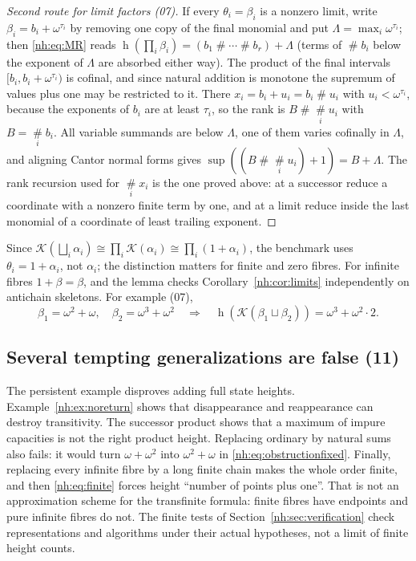 \documentclass[11pt,a4paper]{article}
\theoremstyle{definition}
\theoremstyle{remark}
\newcommand{\K}{\mathcal K}
\newcommand{\hgt}{\operatorname{h}}
\newcommand{\ns}{\mathbin{\#}}
\newcommand{\bigns}{\mathop{\#}\limits}
\begin{document}
\begin{proof}[Second route for limit factors (07)]
If every $\theta_i=\beta_i$ is a nonzero limit, write $\beta_i=b_i+\omega^{\tau_i}$
by removing one copy of the final monomial and put
$\Lambda=\max_i\omega^{\tau_i}$; then \eqref{nh:eq:MR} reads
$\hgt(\prod_i\beta_i)=(b_1\ns\cdots\ns b_r)+\Lambda$ (terms of $\bigns b_i$
below the exponent of $\Lambda$ are absorbed either way). The product of the
final intervals $[b_i,b_i+\omega^{\tau_i})$ is cofinal, and since natural
addition is monotone the supremum of values plus one may be restricted to it.
There $x_i=b_i+u_i=b_i\ns u_i$ with $u_i<\omega^{\tau_i}$, because the exponents
of $b_i$ are at least $\tau_i$, so the rank is $B\ns\bigns_iu_i$ with
$B=\bigns_ib_i$. All variable summands are below $\Lambda$, one of them varies
cofinally in $\Lambda$, and aligning Cantor normal forms gives
$\sup((B\ns\bigns_iu_i)+1)=B+\Lambda$. The rank recursion used for
$\bigns_ix_i$ is the one proved above: at a successor reduce a coordinate
with a nonzero finite term by one, and at a limit reduce inside the last
monomial of a coordinate of least trailing exponent.
\end{proof}

Since $\K(\bigsqcup_i\alpha_i)\cong\prod_i\K(\alpha_i)\cong\prod_i(1+\alpha_i)$,
the benchmark uses $\theta_i=1+\alpha_i$, not $\alpha_i$; the distinction matters
for finite and zero fibres. For infinite fibres $1+\beta=\beta$, and the lemma
checks Corollary~\ref{nh:cor:limits} independently on antichain skeletons. For
example (07),
\[
 \beta_1=\omega^2+\omega,\quad\beta_2=\omega^3+\omega^2
 \quad\Longrightarrow\quad
 \hgt(\K(\beta_1\sqcup\beta_2))=\omega^3+\omega^2\cdot2 .
\]

\subsection{Several tempting generalizations are false (11)}

The persistent example disproves adding full state heights.
Example~\ref{nh:ex:noreturn} shows that disappearance and reappearance can
destroy transitivity. The successor product shows that a maximum of impure
capacities is not the right product height. Replacing ordinary by natural sums
also fails: it would turn $\omega+\omega^2$ into $\omega^2+\omega$ in
\eqref{nh:eq:obstructionfixed}. Finally, replacing every infinite fibre by a
long finite chain makes the whole order finite, and then \eqref{nh:eq:finite}
forces height ``number of points plus one''. That is not an approximation scheme
for the transfinite formula: finite fibres have endpoints and pure infinite
fibres do not. The finite tests of Section~\ref{nh:sec:verification} check
representations and algorithms under their actual hypotheses, not a limit of
finite height counts.
\end{document}
